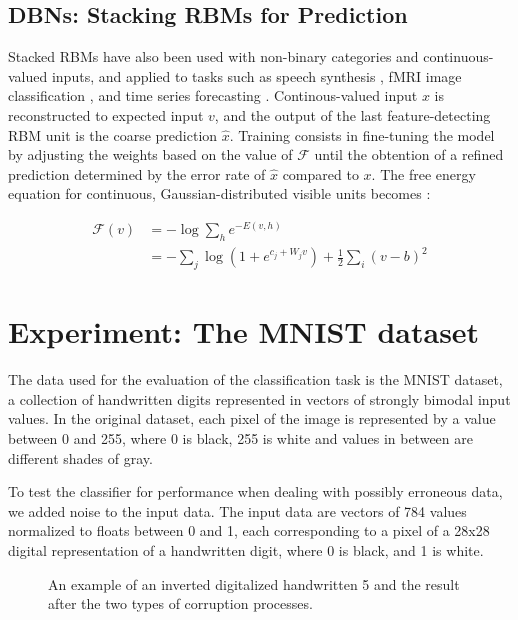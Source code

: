 \documentclass{report}
\begin{document}
\subsection{DBNs: Stacking RBMs for Prediction}
Stacked RBMs have also been used with non-binary categories and continuous-valued inputs, and applied to tasks such as speech synthesis \cite{Jaitly}, fMRI image classification \cite{Schmah}, and time series forecasting \cite{Ginzburg} \cite{Kuremoto}. Continous-valued input $x$ is reconstructed to expected input $v$, and the output of the last feature-detecting RBM unit is the coarse prediction $\hat{x}$. Training consists in fine-tuning the model by adjusting the weights based on the value of $\mathcal{F}$ until the obtention of a refined prediction determined by the error rate of $\hat{x}$ compared to $x$\cite{Kuremoto}. The free energy equation for continuous, Gaussian-distributed visible units becomes \cite{Schmah}:

\begin{align}
\mathcal{F}(v) & = -\log \sum_h e^{-E(v,h)} \nonumber \\
& =  - \sum_j \log (1 + e^{c_j + W_j v}) + \frac{1}{2} \sum_i (v - b)^2
\label{eq:fegbv}
\end{align}




\section{Experiment: The MNIST dataset}
The data used for the evaluation of the classification task is the MNIST dataset, a collection of handwritten digits represented in vectors of strongly bimodal input values. In the original dataset, each pixel of the image is represented by a value between 0 and 255, where 0 is black, 255 is white and values in between are different shades of gray.


To test the classifier for performance when dealing with possibly erroneous data, we added noise to the input data. The input data are vectors of 784 values normalized to floats between 0 and 1, each corresponding to a pixel of a 28x28 digital representation of a handwritten digit, where 0 is black, and 1 is white.

\begin{figure}[h!]
	\caption{An example of an inverted digitalized handwritten 5 and the result after the two types of corruption processes.}
\end{figure}
\end{document}
